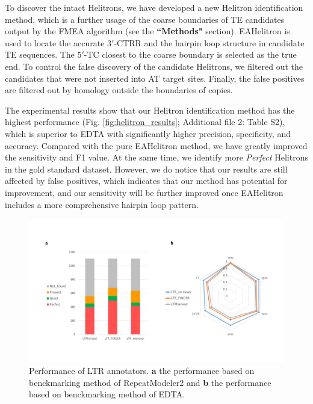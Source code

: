 \documentclass{bmcart}
\begin{document}
To discover the intact Helitrons, we have developed a new Helitron identification method, which is a further usage of the coarse boundaries of TE candidates output by the FMEA algorithm (see the \textbf{``Methods"} section). EAHelitron is used to locate the accurate 3$'$-CTRR and the hairpin loop structure in candidate TE sequences. The 5$'$-TC closest to the coarse boundary is selected as the true end. To control the false discovery of the candidate Helitrons, we filtered out the candidates that were not inserted into AT target sites. Finally, the false positives are filtered out by homology outside the boundaries of copies.

The experimental results show that our Helitron identification method has the highest performance (Fig. \ref{fig:helitron_results}; Additional file 2: Table S2), which is superior to EDTA with significantly higher precision, specificity, and accuracy. Compared with the pure EAHelitron method, we have greatly improved the sensitivity and F1 value. At the same time, we identify more \emph{Perfect} Helitrons in the gold standard dataset. However, we do notice that our results are still affected by false positives, which indicates that our method has potential for improvement, and our sensitivity will be further improved once EAHelitron includes a more comprehensive hairpin loop pattern.

\begin{figure}[h!]
	\centerline{\includegraphics[width=1.0\textwidth]{figures/LTRResults.pdf}}
	\caption{Performance of LTR annotators. \textbf{a} the performance based on benckmarking method of RepeatModeler2 and \textbf{b} the performance based on benckmarking method of EDTA.}
	\label{fig:ltr_results}
\end{figure}
\end{document}
